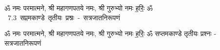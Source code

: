 \documentclass[17pt]{extarticle}
\begin{document}
\begin{titlepage}
    \begin{center}
 
\begin{sanskrit}
    { \Large
    ॐ नमः परमात्मने, श्री महागणपतये नमः, श्री गुरुभ्यो नमः
ह॒रिः॒ ॐ 
    }
    \\
    \vspace{2.5cm}
    \mbox{ \Huge
    7.3      सप्तमकाण्डे तृतीयः प्रश्नः - सत्रजातनिरूपणं   }
\end{sanskrit}
\end{center}

\end{titlepage}
\tableofcontents

ॐ नमः परमात्मने, श्री महागणपतये नमः, श्री गुरुभ्यो नमः
ह॒रिः॒ ॐ       सप्तमकाण्डे तृतीयः प्रश्नः - सत्रजातनिरूपणं \newline

\end{document}
